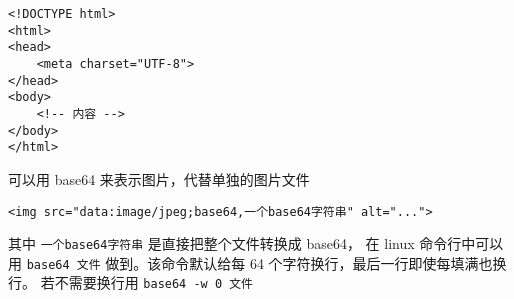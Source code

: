 
\begin{issues}
\issueDraft
\end{issues}

\begin{lstlisting}[language=none]
<!DOCTYPE html>
<html>
<head>
    <meta charset="UTF-8">
</head>
<body>
    <!-- 内容 -->
</body>
</html>
\end{lstlisting}

可以用 base64 来表示图片，代替单独的图片文件
\begin{lstlisting}[language=none]
<img src="data:image/jpeg;base64,一个base64字符串" alt="...">
\end{lstlisting}
其中 \verb|一个base64字符串| 是直接把整个文件转换成 base64， 在 linux 命令行中可以用 \verb|base64 文件| 做到。该命令默认给每 64 个字符换行，最后一行即使每填满也换行。 若不需要换行用 \verb|base64 -w 0 文件|
